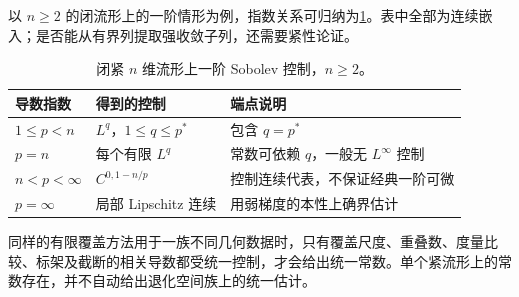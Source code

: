 以 \(n\ge2\) 的闭流形上的一阶情形为例，指数关系可归纳为\cref{g3:tab:first-sobolev-embeddings}。表中全部为连续嵌入；是否能从有界列提取强收敛子列，还需要紧性论证。
\begin{table}[htbp]
	\centering
	\caption{闭紧 \(n\) 维流形上一阶 Sobolev 控制，\(n\ge2\)。}
	\label{g3:tab:first-sobolev-embeddings}
	\begin{tabularx}{\textwidth}{@{}lXX@{}}
		\toprule
		导数指数 & 得到的控制 & 端点说明\\
		\midrule
		\(1\le p<n\) & \(L^q\)，\(1\le q\le p^*\) & 包含 \(q=p^*\)\\
		\(p=n\) & 每个有限 \(L^q\) & 常数可依赖 \(q\)，一般无 \(L^\infty\) 控制\\
		\(n<p<\infty\) & \(C^{0,1-n/p}\) & 控制连续代表，不保证经典一阶可微\\
		\(p=\infty\) & 局部 Lipschitz 连续 & 用弱梯度的本性上确界估计\\
		\bottomrule
	\end{tabularx}
\end{table}
同样的有限覆盖方法用于一族不同几何数据时，只有覆盖尺度、重叠数、度量比较、标架及截断的相关导数都受统一控制，才会给出统一常数。单个紧流形上的常数存在，并不自动给出退化空间族上的统一估计。
